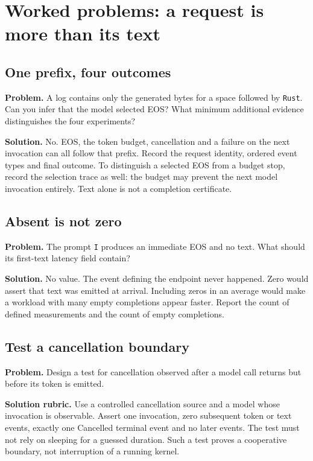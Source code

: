 \section{Worked problems: a request is more than its text}
\begin{minipage}{\linewidth}
\subsection{One prefix, four outcomes}
\textbf{Problem.} A log contains only the generated bytes for a space followed
by \texttt{Rust}. Can you infer that the model selected EOS? What minimum
additional evidence distinguishes the four experiments?

\textbf{Solution.} No. EOS, the token budget, cancellation and a failure on
the next invocation can all follow that prefix. Record the request identity,
ordered event types and final outcome. To distinguish a selected EOS from a
budget stop, record the selection trace as well: the budget may prevent the
next model invocation entirely. Text alone is not a completion certificate.
\end{minipage}\par

\begin{minipage}{\linewidth}
\subsection{Absent is not zero}
\textbf{Problem.} The prompt \texttt{I} produces an immediate EOS and no text.
What should its first-text latency field contain?

\textbf{Solution.} No value. The event defining the endpoint never happened.
Zero would assert that text was emitted at arrival. Including zeros in an
average would make a workload with many empty completions appear faster.
Report the count of defined measurements and the count of empty completions.
\end{minipage}\par

\begin{minipage}{\linewidth}
\subsection{Test a cancellation boundary}
\textbf{Problem.} Design a test for cancellation observed after a model call
returns but before its token is emitted.

\textbf{Solution rubric.} Use a controlled cancellation source and a model
whose invocation is observable. Assert one invocation, zero subsequent token
or text events, exactly one Cancelled terminal event and no later events.
The test must not rely on sleeping for a guessed duration. Such a test proves
a cooperative boundary, not interruption of a running kernel.
\end{minipage}\par

